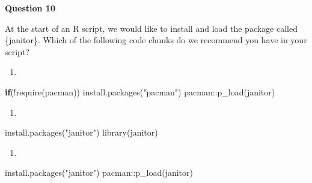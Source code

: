 \documentclass[
  letterpaper,
  DIV=11,
  numbers=noendperiod]{scrreprt}
\newenvironment{Shaded}{\begin{snugshade}}{\end{snugshade}}
\newcommand{\ControlFlowTok}[1]{\textcolor[rgb]{0.00,0.23,0.31}{\textbf{#1}}}
\newcommand{\FunctionTok}[1]{\textcolor[rgb]{0.28,0.35,0.67}{#1}}
\newcommand{\NormalTok}[1]{\textcolor[rgb]{0.00,0.23,0.31}{#1}}
\newcommand{\SpecialCharTok}[1]{\textcolor[rgb]{0.37,0.37,0.37}{#1}}
\newcommand{\StringTok}[1]{\textcolor[rgb]{0.13,0.47,0.30}{#1}}
\providecommand{\tightlist}{%
  \setlength{\itemsep}{0pt}\setlength{\parskip}{0pt}}\usepackage{longtable,booktabs,array}
\begin{document}
\begin{tcolorbox}[enhanced jigsaw, titlerule=0mm, colback=white, left=2mm, breakable, opacitybacktitle=0.6, colbacktitle=quarto-callout-tip-color!10!white, colframe=quarto-callout-tip-color-frame, bottomtitle=1mm, opacityback=0, coltitle=black, arc=.35mm, toptitle=1mm, title=\textcolor{quarto-callout-tip-color}{\faLightbulb}\hspace{0.5em}{Practice}, leftrule=.75mm, toprule=.15mm, bottomrule=.15mm, rightrule=.15mm]

\textbf{Question 10}

At the start of an R script, we would like to install and load the
package called \{janitor\}. Which of the following code chunks do we
recommend you have in your script?

\begin{enumerate}
\def\labelenumi{\Alph{enumi}.}
\tightlist
\item
\end{enumerate}

\begin{Shaded}
\begin{Highlighting}[]
\ControlFlowTok{if}\NormalTok{(}\SpecialCharTok{!}\FunctionTok{require}\NormalTok{(pacman)) }\FunctionTok{install.packages}\NormalTok{(}\StringTok{"pacman"}\NormalTok{)}
\NormalTok{pacman}\SpecialCharTok{::}\FunctionTok{p\_load}\NormalTok{(janitor)}
\end{Highlighting}
\end{Shaded}

\begin{enumerate}
\def\labelenumi{\Alph{enumi}.}
\setcounter{enumi}{1}
\tightlist
\item
\end{enumerate}

\begin{Shaded}
\begin{Highlighting}[]
\FunctionTok{install.packages}\NormalTok{(}\StringTok{"janitor"}\NormalTok{)}
\FunctionTok{library}\NormalTok{(janitor)}
\end{Highlighting}
\end{Shaded}

\begin{enumerate}
\def\labelenumi{\Alph{enumi}.}
\setcounter{enumi}{2}
\tightlist
\item
\end{enumerate}

\begin{Shaded}
\begin{Highlighting}[]
\FunctionTok{install.packages}\NormalTok{(}\StringTok{"janitor"}\NormalTok{)}
\NormalTok{pacman}\SpecialCharTok{::}\FunctionTok{p\_load}\NormalTok{(janitor)}
\end{Highlighting}
\end{Shaded}

\end{tcolorbox}
\end{document}
